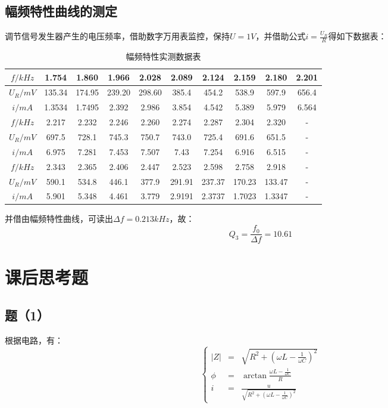 \documentclass{ctexart}
\begin{document}
\subsection{幅频特性曲线的测定}
调节信号发生器产生的电压频率，借助数字万用表监控，保持$U=1V$，并借助公式$i=\frac{U_R}{R}$得如下数据表：
\begin{table}[H]
  \centering
  \caption{幅频特性实测数据表}
    \begin{tabular}{|c|c|c|c|c|c|c|c|c|c|}\hline
    $f/kHz$ & 1.754 & 1.860 & 1.966 & 2.028 & 2.089 & 2.124 & 2.159 & 2.180 & 2.201 \\\hline
    $U_R/mV$ & 135.34 & 174.95 & 239.20 & 298.60 & 385.4 & 454.2 & 538.9 & 597.9 & 656.4 \\\hline
    $i/mA$ & 1.3534 & 1.7495 & 2.392 & 2.986 & 3.854 & 4.542 & 5.389 & 5.979 & 6.564 \\\hline
    $f/kHz$ & 2.217 & 2.232 & 2.246 & 2.260 & 2.274 & 2.287 & 2.304 & 2.320 & - \\\hline
    $U_R/mV$ & 697.5 & 728.1 & 745.3 & 750.7 & 743.0 & 725.4 & 691.6 & 651.5 & - \\\hline
    $i/mA$ & 6.975 & 7.281 & 7.453 & 7.507 & 7.43  & 7.254 & 6.916 & 6.515 &  -\\\hline
    $f/kHz$ & 2.343 & 2.365 & 2.406 & 2.447 & 2.523 & 2.598 & 2.758 & 2.918 &  -\\\hline
    $U_R/mV$ & 590.1 & 534.8 & 446.1 & 377.9 & 291.91 & 237.37 & 170.23 & 133.47 &-  \\\hline
    $i/mA$ & 5.901 & 5.348 & 4.461 & 3.779 & 2.9191 & 2.3737 & 1.7023 & 1.3347 &  -\\\hline
    \end{tabular}%
  \label{tab:addlabel}%
\end{table}%


并借由幅频特性曲线，可读出$\Delta f=0.213 kHz$，故：$$Q_3=\frac{f_0}{\Delta f}=10.61$$

\section{课后思考题}
\subsection{题（1）}
根据电路，有：$$ \left\{
  \begin{aligned}
  |Z| & = & \sqrt{R^2+(\omega L-\frac{1}{\omega C})^2} \\
  \phi & = & \arctan{\frac{\omega L-\frac{1}{\omega C}}{R}} \\
  i & = & \frac {u}{\sqrt{R^2+(\omega L-\frac{1}{\omega C})^2}}
  \end{aligned}
  \right.
  $$
\end{document}
